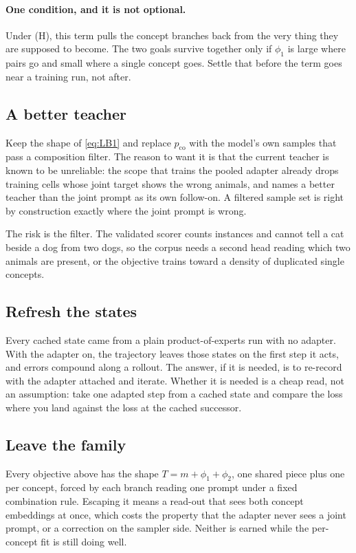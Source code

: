 \documentclass[11pt]{article}
\begin{document}
\paragraph{One condition, and it is not optional.}
Under (H), this term pulls the concept branches back from the very thing they are supposed to
become. The two goals survive together only if $\phi_1$ is large where pairs go and small where a
single concept goes. Settle that before the term goes near a training run, not after.

\subsection*{A better teacher}
Keep the shape of \eqref{eq:LB1} and replace $p_{\mathrm{co}}$ with the model's own samples that
pass a composition filter. The reason to want it is that the current teacher is known to be
unreliable: the scope that trains the pooled adapter already drops training cells whose joint target
shows the wrong animals, and names a better teacher than the joint prompt as its own follow-on. A
filtered sample set is right by construction exactly where the joint prompt is wrong.

The risk is the filter. The validated scorer counts instances and cannot tell a cat beside a dog
from two dogs, so the corpus needs a second head reading which two animals are present, or the
objective trains toward a density of duplicated single concepts.

\subsection*{Refresh the states}
Every cached state came from a plain product-of-experts run with no adapter. With the adapter on,
the trajectory leaves those states on the first step it acts, and errors compound along a rollout.
The answer, if it is needed, is to re-record with the adapter attached and iterate. Whether it is
needed is a cheap read, not an assumption: take one adapted step from a cached state and compare the
loss where you land against the loss at the cached successor.

\subsection*{Leave the family}
Every objective above has the shape $T = m + \phi_1 + \phi_2$, one shared piece plus one per
concept, forced by each branch reading one prompt under a fixed combination rule. Escaping it means
a read-out that sees both concept embeddings at once, which costs the property that the adapter
never sees a joint prompt, or a correction on the sampler side. Neither is earned while the
per-concept fit is still doing well.
\end{document}
